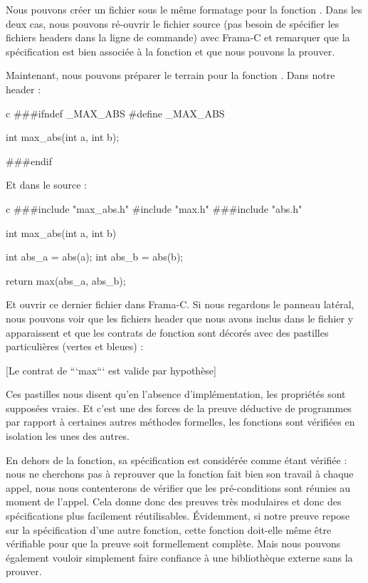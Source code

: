 Nous pouvons créer un fichier sous le même formatage pour la fonction .
Dans les deux cas, nous pouvons ré-ouvrir le fichier source (pas besoin de 
spécifier les fichiers headers dans la ligne de commande) avec Frama-C et 
remarquer que la spécification est bien associée à la fonction et que nous
pouvons la prouver.



Maintenant, nous pouvons préparer le terrain pour la fonction . 
Dans notre header :



\begin{CodeBlock}{c}
###ifndef _MAX_ABS
#define _MAX_ABS

int max_abs(int a, int b);

###endif
\end{CodeBlock}



Et dans le source :



\begin{CodeBlock}{c}
###include "max_abs.h"
#include "max.h"
###include "abs.h"

int max_abs(int a, int b){
  int abs_a = abs(a);
  int abs_b = abs(b);

  return max(abs_a, abs_b);
}
\end{CodeBlock}



Et ouvrir ce dernier fichier dans Frama-C. Si nous regardons le panneau latéral, 
nous pouvons voir que les fichiers header que nous avons inclus dans le fichier 
 y apparaissent et que les contrats de fonction sont décorés avec des 
pastilles particulières (vertes et bleues) :



[Le contrat de ```max``` est valide par hypothèse]


Ces pastilles nous disent qu'en l'absence d'implémentation, les propriétés sont
supposées vraies. Et c'est une des forces de la preuve déductive de programmes 
par rapport à certaines autres méthodes formelles, les fonctions sont vérifiées
en isolation les unes des autres.



En dehors de la fonction, sa spécification est considérée comme étant 
vérifiée : nous ne cherchons pas à reprouver que la fonction fait bien son travail
à chaque appel, nous nous contenterons de vérifier que les pré-conditions sont 
réunies au moment de l'appel. Cela donne donc des preuves très modulaires et donc 
des spécifications plus facilement réutilisables. Évidemment, si notre preuve 
repose sur la spécification d'une autre fonction, cette fonction doit-elle même 
être vérifiable pour que la preuve soit formellement complète. Mais nous pouvons
également vouloir simplement faire confiance à une bibliothèque externe sans la
prouver.



